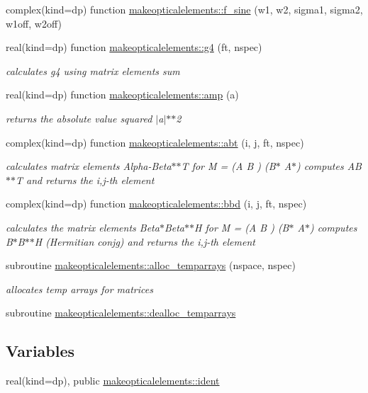 \begin{DoxyCompactItemize}
complex(kind=dp) function \hyperlink{namespacemakeopticalelements_ac31d9c650a776cc4ebd4de3bcc370207}{makeopticalelements\+::f\+\_\+sine} (w1, w2, sigma1, sigma2, w1off, w2off)
\item 
real(kind=dp) function \hyperlink{namespacemakeopticalelements_af1a18704c55aa2efeb60157c81a80723}{makeopticalelements\+::g4} (ft, nspec)
\begin{DoxyCompactList}\small\item\em calculates g4 using matrix elements sum  \end{DoxyCompactList}\item 
real(kind=dp) function \hyperlink{namespacemakeopticalelements_a0649740479f47221d009b8d496b78c8b}{makeopticalelements\+::amp} (a)
\begin{DoxyCompactList}\small\item\em returns the absolute value squared $\vert$a$\vert$$\ast$$\ast$2 \end{DoxyCompactList}\item 
complex(kind=dp) function \hyperlink{namespacemakeopticalelements_a1b408449683f6bcc96ee25d4bbc1aa8b}{makeopticalelements\+::abt} (i, j, ft, nspec)
\begin{DoxyCompactList}\small\item\em calculates matrix elements Alpha-\/\+Beta$\ast$$\ast$T  for M = (A B ) (B$\ast$ A$\ast$) computes A\+B$\ast$$\ast$T and returns the i,j-\/th element \end{DoxyCompactList}\item 
complex(kind=dp) function \hyperlink{namespacemakeopticalelements_a7d0e54a1c7f830fd961f3c99d0a49b30}{makeopticalelements\+::bbd} (i, j, ft, nspec)
\begin{DoxyCompactList}\small\item\em calculates the matrix elements Beta$\ast$\+Beta$\ast$$\ast$H  for M = (A B ) (B$\ast$ A$\ast$) computes B$\ast$\+B$\ast$$\ast$H (Hermitian conjg) and returns the i,j-\/th element \end{DoxyCompactList}\item 
subroutine \hyperlink{namespacemakeopticalelements_aefda61530c80eccf75e7065015af413d}{makeopticalelements\+::alloc\+\_\+temparrays} (nspace, nspec)
\begin{DoxyCompactList}\small\item\em allocates temp arrays for matrices \end{DoxyCompactList}\item 
subroutine \hyperlink{namespacemakeopticalelements_aab212aad9e53b7ae643456f9bc0b68cb}{makeopticalelements\+::dealloc\+\_\+temparrays}
\end{DoxyCompactItemize}
\subsection*{Variables}
\begin{DoxyCompactItemize}
\item 
real(kind=dp), public \hyperlink{namespacemakeopticalelements_ab4e48a98a0fb0756bb4eff6ece9623a8}{makeopticalelements\+::ident}
\end{DoxyCompactItemize}
